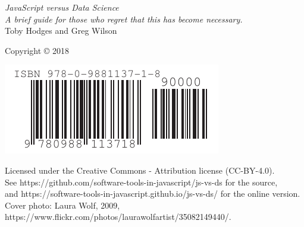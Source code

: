 {\Huge\itshape JavaScript versus Data Science}\\[\baselineskip]

{\large\itshape
  A brief guide for those who regret that this has become necessary.
}\\[0.2\textheight]

{\large Toby Hodges and Greg Wilson}\par

\vfill

{\large Copyright {\copyright} 2018}

\vspace*{\baselineskip}

\includegraphics{../../etc/isbn-barcode.pdf}

\vspace*{\baselineskip}

{\small
  Licensed under the Creative Commons - Attribution license (CC-BY-4.0).
  \\
  See https://github.com/software-tools-in-javascript/js-vs-ds for the source,
  \\
  and https://software-tools-in-javascript.github.io/js-vs-ds/ for the online version.
  \\
  Cover photo: Laura Wolf, 2009, https://www.flickr.com/photos/laurawolfartist/35082149440/.
}
